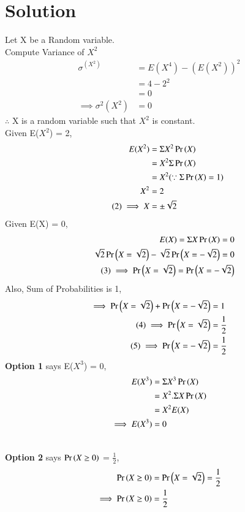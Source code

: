 \documentclass[journal,12pt,twocolumn]{IEEEtran}
\begin{document}
\section{\textbf{Solution}}
Let X be a Random variable. \\
Compute Variance of $X^2$ 
\begin{align*}
    \sigma^(X^2) &= E(X^4) - (E(X^2))^{2} \\
             &=  4 - 2^2 \\
             &= 0\\
\tag{1} \label{Var(X^2)}   \implies \sigma^2(X^2) &= 0
\end{align*}
$\therefore$ X is a random variable such that $X^2$ is constant.\\
Given E($X^2$) = 2,
\begin{align*}
    E(X^2) &= \Sigma X^2\Pr\left(X\right) \\
           &= X^2\Sigma \Pr\left(X\right)  \\
           &= X^2 (\because \Sigma \Pr\left(X\right) = 1) \\
       X^2 &= 2 \\
\tag{2} \label{X}
\implies X &= \pm \sqrt{2}
\end{align*}
Given E(X) = 0,
\begin{align*}
                      E(X) = \Sigma X\Pr\left(X\right) = 0 \\
                    \sqrt{2}\Pr\left(X = \sqrt{2}\right)-\sqrt{2}\Pr\left(X = -\sqrt{2}\right) = 0\\
      \tag{3} \label{P(X)}
\implies \Pr\left(X = \sqrt{2}\right) = \Pr\left(X = -\sqrt{2}\right)
\end{align*}
\centering
Also, Sum of Probabilities is 1,
\begin{align*}
    \implies \Pr\left(X = \sqrt{2}\right) + \Pr\left(X =-\sqrt{2}\right) &= 1 \\
    \tag{4} \label{X > 0}
    \implies                     \Pr\left(X = \sqrt{2}\right) &= \frac{1}{2} \\
    \tag{5} \label{X < 0}
    \implies                    \Pr\left(X = -\sqrt{2}\right) &= \frac{1}{2}
\end{align*}
\centering
\textbf{Option 1} says E($X^3$) = 0,
\begin{align*}
    E(X^3) &= \Sigma X^3 \Pr\left(X\right) \\
           &= X^2 .\Sigma X \Pr\left(X\right) \\
           &= X^2 E(X)\\
\implies E(X^3) &= 0      
\end{align*} 

\centering {}
\vspace{0.8cm} \\
\textbf{Option 2} says $\Pr\left(X \ge 0\right)$ = $\frac{1}{2}$,
\begin{align*}
    \Pr\left(X\ge 0\right) &= \Pr\left(X = \sqrt{2}\right) = \frac{1}{2} \\
    \implies \Pr\left(X \ge 0\right) &= \frac{1}{2}
\end{align*}
\end{document}
